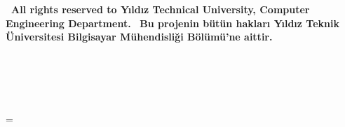 \ifnum{}
\textbf{\footnotesize\centering\textcopyright~All rights reserved to Yıldız Technical University, Computer Engineering Department.}
\else
\textbf{\footnotesize\centering\textcopyright~Bu projenin bütün hakları Yıldız Teknik Üniversitesi Bilgisayar Mühendisliği Bölümü’ne aittir.}
\fi


\ifnum{}
\newpage
\chapter*{\acknowledgements}

\acknowledgementText

\begin{flushright}
\studenti\\
\studentii
\end{flushright}
\fi

\pagestyle{fancy}
\newpage
\chapter*{\contents}
\renewcommand\contentsname{\vspace{-3.6em}}
\tableofcontents




=\vbox{\symbols\unskip}\ifdim\wd0=0pt

\else
    \newpage
    \chapter*{\symbolName}
    \addcontentsline{toc}{chapter}{\symbolName}
    \vspace{-0.3em}
    \symbols
\fi

